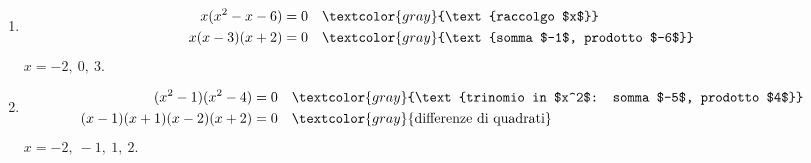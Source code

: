 \begin{question}[ID=5.4, subtitle={Legge dell'annullamento del prodotto e scomposizione}, difficulty=media, tags={annullamento del prodotto}]
\begin{explanation}
\begin{enumerate}
\[\begin{aligned}
    x(x+4)(x-2) &= 0 && \textcolor{gray}{\text{somma $2$, prodotto $-8$}}
    \end{aligned}\]
    $x=-4,\ 0,\ 2$.
    \item \[\begin{aligned}
    x(x^2-x-6) &= 0 && \textcolor{gray}{\text{raccolgo $x$}}\\
    x(x-3)(x+2) &= 0 && \textcolor{gray}{\text{somma $-1$, prodotto $-6$}}
    \end{aligned}\]
    $x=-2,\ 0,\ 3$.
    \item \[\begin{aligned}
    (x^2-1)(x^2-4) &= 0 && \textcolor{gray}{\text{trinomio in $x^2$: somma $-5$, prodotto $4$}}\\
    (x-1)(x+1)(x-2)(x+2) &= 0 && \textcolor{gray}{\text{differenze di quadrati}}
    \end{aligned}\]
    $x=-2,\ -1,\ 1,\ 2$.
\end{enumerate}
\end{explanation}
\end{question}


